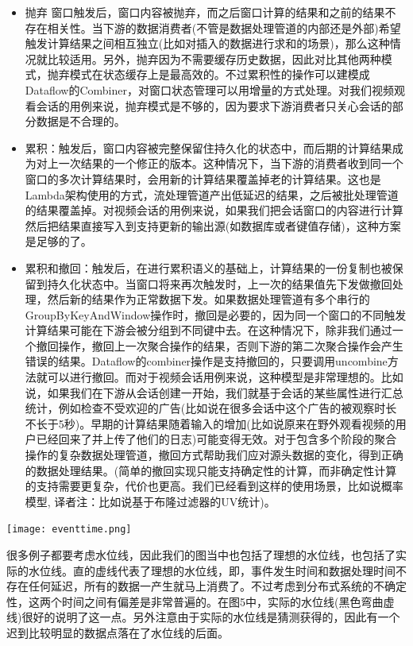 \documentclass[oneside]{ctexbook}
\begin{document}
\begin{itemize}
\item 抛弃 窗口触发后，窗口内容被抛弃，而之后窗口计算的结果和之前的结果不存在相关性。当下游的数据消费者(不管是数据处理管道的内部还是外部)希望触发计算结果之间相互独立(比如对插入的数据进行求和的场景)，那么这种情况就比较适用。另外，抛弃因为不需要缓存历史数据，因此对比其他两种模式，抛弃模式在状态缓存上是最高效的。不过累积性的操作可以建模成Dataflow的Combiner，对窗口状态管理可以用增量的方式处理。对我们视频观看会话的用例来说，抛弃模式是不够的，因为要求下游消费者只关心会话的部分数据是不合理的。
\item 累积：触发后，窗口内容被完整保留住持久化的状态中，而后期的计算结果成为对上一次结果的一个修正的版本。这种情况下，当下游的消费者收到同一个窗口的多次计算结果时，会用新的计算结果覆盖掉老的计算结果。这也是Lambda架构使用的方式，流处理管道产出低延迟的结果，之后被批处理管道的结果覆盖掉。对视频会话的用例来说，如果我们把会话窗口的内容进行计算然后把结果直接写入到支持更新的输出源(如数据库或者键值存储)，这种方案是足够的了。
\item 累积和撤回：触发后，在进行累积语义的基础上，计算结果的一份复制也被保留到持久化状态中。当窗口将来再次触发时，上一次的结果值先下发做撤回处理，然后新的结果作为正常数据下发。如果数据处理管道有多个串行的GroupByKeyAndWindow操作时，撤回是必要的，因为同一个窗口的不同触发计算结果可能在下游会被分组到不同键中去。在这种情况下，除非我们通过一个撤回操作，撤回上一次聚合操作的结果，否则下游的第二次聚合操作会产生错误的结果。Dataflow的combiner操作是支持撤回的，只要调用uncombine方法就可以进行撤回。而对于视频会话用例来说，这种模型是非常理想的。比如说，如果我们在下游从会话创建一开始，我们就基于会话的某些属性进行汇总统计，例如检查不受欢迎的广告(比如说在很多会话中这个广告的被观察时长不长于5秒)。早期的计算结果随着输入的增加(比如说原来在野外观看视频的用户已经回来了并上传了他们的日志)可能变得无效。对于包含多个阶段的聚合操作的复杂数据处理管道，撤回方式帮助我们应对源头数据的变化，得到正确的数据处理结果。(简单的撤回实现只能支持确定性的计算，而非确定性计算的支持需要更复杂，代价也更高。我们已经看到这样的使用场景，比如说概率模型, 译者注：比如说基于布隆过滤器的UV统计)。
\end{itemize}

\noindent \texttt{[image: eventtime.png]}

很多例子都要考虑水位线，因此我们的图当中也包括了理想的水位线，也包括了实际的水位线。直的虚线代表了理想的水位线，即，事件发生时间和数据处理时间不存在任何延迟，所有的数据一产生就马上消费了。不过考虑到分布式系统的不确定性，这两个时间之间有偏差是非常普遍的。在图5中，实际的水位线(黑色弯曲虚线)很好的说明了这一点。另外注意由于实际的水位线是猜测获得的，因此有一个迟到比较明显的数据点落在了水位线的后面。
\end{document}
